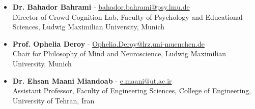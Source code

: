 \documentclass[a4paper,10pt]{article}
\begin{document}
\begin{itemize}
    \item \textbf{Dr. Bahador Bahrami} - \href{mailto:bahador.bahrami@psy.lmu.de}{bahador.bahrami@psy.lmu.de}\\
    Director of Crowd Cognition Lab, Faculty of Psychology and Educational Sciences, Ludwig Maximilian University, Munich
    \item \textbf{Prof. Ophelia Deroy} - \href{mailto:Ophelia.Deroy@lrz.uni-muenchen.de}{Ophelia.Deroy@lrz.uni-muenchen.de}\\
    Chair for Philosophy of Mind and Neuroscience, Ludwig Maximilian University, Munich
    \item \textbf{Dr. Ehsan Maani Miandoab} - \href{mailto:e.maani@ut.ac.ir}{e.maani@ut.ac.ir}\\
    Assistant Professor, Faculty of Engineering Sciences, College of Engineering, University of Tehran, Iran

\end{itemize}
\end{document}
